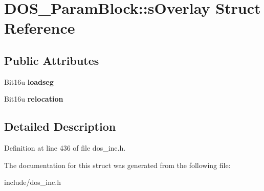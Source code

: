 \hypertarget{structDOS__ParamBlock_1_1sOverlay}{\section{D\-O\-S\-\_\-\-Param\-Block\-:\-:s\-Overlay Struct Reference}
\label{structDOS__ParamBlock_1_1sOverlay}
}
\subsection*{Public Attributes}
\begin{DoxyCompactItemize}
\item 
\hypertarget{structDOS__ParamBlock_1_1sOverlay_a6aa3b07fbae37d952b116773e87712cc}{Bit16u {\bfseries loadseg}}\label{structDOS__ParamBlock_1_1sOverlay_a6aa3b07fbae37d952b116773e87712cc}

\item 
\hypertarget{structDOS__ParamBlock_1_1sOverlay_a1fec335c736328ce8eb8096a2df9ccc6}{Bit16u {\bfseries relocation}}\label{structDOS__ParamBlock_1_1sOverlay_a1fec335c736328ce8eb8096a2df9ccc6}

\end{DoxyCompactItemize}


\subsection{Detailed Description}


Definition at line 436 of file dos\-\_\-inc.\-h.



The documentation for this struct was generated from the following file\-:\begin{DoxyCompactItemize}
\item 
include/dos\-\_\-inc.\-h\end{DoxyCompactItemize}

